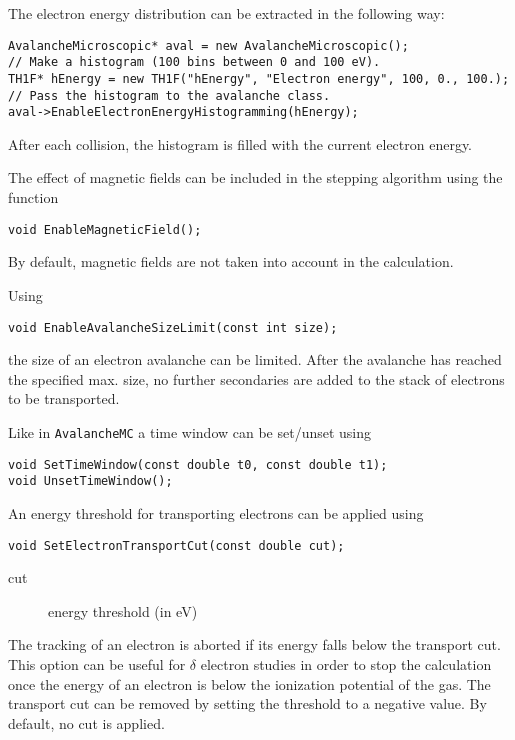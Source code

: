 The electron energy distribution can be extracted in the following way:
\begin{lstlisting}
AvalancheMicroscopic* aval = new AvalancheMicroscopic();
// Make a histogram (100 bins between 0 and 100 eV).
TH1F* hEnergy = new TH1F("hEnergy", "Electron energy", 100, 0., 100.);
// Pass the histogram to the avalanche class.
aval->EnableElectronEnergyHistogramming(hEnergy);
\end{lstlisting} 
After each collision, 
the histogram is filled with the current electron energy. 

The effect of magnetic fields can be included 
in the stepping algorithm using the function
\begin{lstlisting}
void EnableMagneticField();
\end{lstlisting}
By default, magnetic fields are not taken into account in the calculation.

Using 
\begin{lstlisting}
void EnableAvalancheSizeLimit(const int size);
\end{lstlisting}
the size of an electron avalanche can be limited. 
After the avalanche has reached the specified max. size, 
no further secondaries are added to the stack of electrons to be transported.  

Like in \texttt{AvalancheMC} a time window can be set/unset using
\begin{lstlisting}
void SetTimeWindow(const double t0, const double t1);
void UnsetTimeWindow();
\end{lstlisting}

An energy threshold for transporting electrons can be applied using 
\begin{lstlisting}
void SetElectronTransportCut(const double cut);
\end{lstlisting}
\begin{description}
  \item[cut] energy threshold (in eV)
\end{description}
The tracking of an electron is aborted if its energy falls below the 
transport cut. This option can be useful for \(\delta\) electron studies in 
order to stop the calculation once the energy of an electron 
is below the ionization potential of the gas. 
The transport cut can be removed by setting the threshold to a negative value.
By default, no cut is applied.

